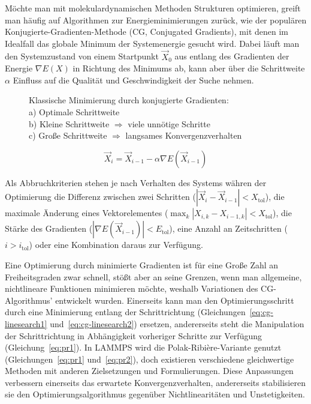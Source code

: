 Möchte man mit molekulardynamischen Methoden Strukturen optimieren, greift man häufig auf Algorithmen zur Energieminimierungen zurück, wie der populären Konjugierte-Gradienten-Methode (CG, Conjugated Gradients), mit denen im Idealfall das globale Minimum der Systemenergie gesucht wird.
Dabei läuft man den Systemzustand von einem Startpunkt $\vec X_0$ aus entlang des Gradienten der Energie $\nabla E(X)$ in Richtung des Minimums ab, kann aber über die Schrittweite $\alpha$ Einfluss auf die Qualität und Geschwindigkeit der Suche nehmen.

\begin{figure}
  \centering
  \def\svgwidth{0.5\textwidth}
  
  \caption[CG-Methode]{Klassische Minimierung durch konjugierte Gradienten:\\
    a) Optimale Schrittweite\\
    b) Kleine Schrittweite $\Rightarrow$ viele unnötige Schritte\\
    c) Große Schrittweite $\Rightarrow$ langsames Konvergenzverhalten
  }
  \label{fig:cg-gradient}
\end{figure}

\begin{equation}
  \vec X_i = \vec X_{i-1} - \alpha \nabla E(\vec X_{i-1})
\end{equation}

Als Abbruchkriterien stehen je nach Verhalten des Systems währen der Optimierung die Differenz zwischen zwei Schritten ($\left|\vec X_i - \vec X_{i-1}\right| < X_\text{tol}$), die maximale Änderung eines Vektorelementes ($\max_k{\left|X_{i,k} - X_{i-1,k}\right|} < X_\text{tol}$), %
die Stärke des Gradienten ($\left|\nabla E(\vec X_{i-1})\right| < E_\text{tol}$), eine Anzahl an Zeitschritten ($i > i_\text{tol}$) oder eine Kombination daraus zur Verfügung.

Eine Optimierung durch minimierte Gradienten ist für eine Große Zahl an Freiheitsgraden zwar schnell, stößt aber an seine Grenzen, wenn man allgemeine, nichtlineare Funktionen minimieren möchte, weshalb Variationen des CG-Algorithmus' entwickelt wurden.
Einerseits kann man den Optimierungsschritt durch eine Minimierung entlang der Schrittrichtung (Gleichungen~\ref{eq:cg-linesearch1} und~\ref{eq:cg-linesearch2}) ersetzen, andererseits steht die Manipulation der Schrittrichtung in Abhängigkeit vorheriger Schritte zur Verfügung (Gleichung~\ref{eq:pr1}).
In LAMMPS wird die Polak-Ribière-Variante genutzt (Gleichungen~\ref{eq:pr1} und~\ref{eq:pr2}), doch existieren verschiedene gleichwertige Methoden mit anderen Zielsetzungen und Formulierungen.
Diese Anpassungen verbessern einerseits das erwartete Konvergenzverhalten, andererseits stabilisieren sie den Optimierungsalgorithmus gegenüber Nichtlinearitäten und Unstetigkeiten.

